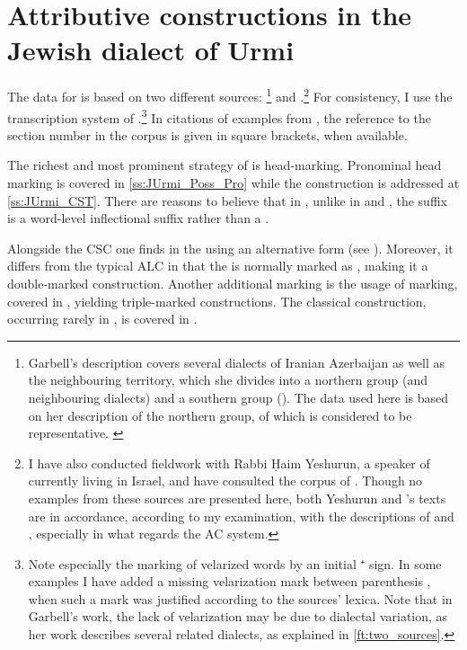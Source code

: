 






\chapter{Attributive constructions in the Jewish dialect of Urmi}

\renewcommand{\defaultDialect}{\JUrm}

The data for \JUrm is based on two different sources: \citet{GarbellUrmi}\footnote{Garbell's description covers several dialects of Iranian Azerbaijan as well as the neighbouring  territory, which she divides into a northern group (\JUrm and neighbouring dialects) and a southern group (\Sol). The data used here is based on her description of the northern group, of which \JUrm is considered to be representative. \label{ft:two_sources}} and \citet{KhanUrmi}.\footnote{I have also conducted fieldwork with Rabbi Ḥaim Yeshurun, a speaker of \JUrm currently living in Israel, and have consulted the corpus of \citet{BenRahamim}. Though no examples from these sources are presented here, both Yeshurun and \citeauthor{BenRahamim}'s texts are in accordance, according to my examination, with the descriptions of \citeauthor{GarbellUrmi} and \citeauthor{KhanUrmi}, especially in what regards the AC system.} For consistency, I use the transcription system of \citeauthor{KhanUrmi}.\footnote{Note especially the marking of velarized words by an initial ⁺ sign. In some examples I have added a missing velarization mark between parenthesis \parplus, when such a mark was justified according to the sources' lexica. Note that in Garbell's work, the lack of velarization may be due to dialectal variation, as her work describes several related dialects, as explained in \vref{ft:two_sources}.} In citations of examples from \citeauthor{KhanUrmi}, the reference to the section number in the corpus is given in square brackets, when available. 

The richest and most prominent  strategy of \JUrm is head-marking. Pronominal head marking is covered in \ref{ss:JUrmi_Poss_Pro} while the  construction is addressed at \ref{ss:JUrmi_CST}. There are reasons to believe that in \JUrm, unlike in  \JZax and \Qar, the \cst* \ed suffix is a word-level inflectional suffix rather than a . 

Alongside the CSC one finds in \JUrm the  using an alternative \lnk* form  (see ). Moreover, it differs from the typical ALC in that the \prim is normally marked as \cst*, making it a double-marked construction. Another additional marking is the usage of  \gen* marking, covered in , yielding triple-marked constructions. The classical  construction, occurring rarely in \JUrm, is covered in . 

